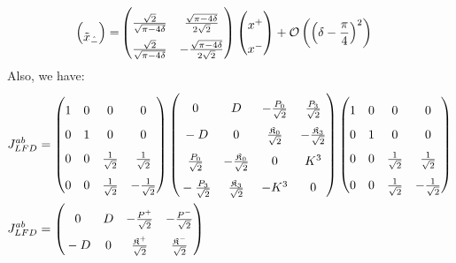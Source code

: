 \documentclass[]{article}
\numberwithin{equation}{section}
\begin{document}
{{\begin{align}
\begin{pmatrix}
    \rule{0pt}{16pt} \tilde{x}_{\hat{-}}
  \end{pmatrix}=&
  \begin{pmatrix}
    \rule{0pt}{16pt} \frac{\sqrt{2}}{\sqrt{\pi-4\delta}} & \frac{\sqrt{\pi-4\delta}}{2\sqrt{2}} \\
    \rule{0pt}{16pt} \frac{\sqrt{2}}{\sqrt{\pi-4\delta}} & -\frac{\sqrt{\pi-4\delta}}{2\sqrt{2}}
  \end{pmatrix}
  \begin{pmatrix}
    \rule{0pt}{16pt} x^{+}\\
   \rule{0pt}{16pt} x^{-}
  \end{pmatrix}+\mathcal{O}\left(\left(\delta-\frac{\pi}{4}\right)^{2}\right)
\end{align}
Also, we have:
\begin{align}
    J^{{a}{b}}_{LFD}&=\begin{pmatrix}
        \rule{0pt}{16pt} 1&0&0&0\\
        \rule{0pt}{16pt} 0&1&0&0\\
        \rule{0pt}{16pt} 0&0&\frac{1}{\sqrt{2}}&\frac{1}{\sqrt{2}}\\
        \rule{0pt}{16pt} 0&0&\frac{1}{\sqrt{2}}&-\frac{1}{\sqrt{2}}
    \end{pmatrix}\begin{pmatrix}
    \rule{0pt}{16pt} 0&D&-\frac{P_{{0}}}{\sqrt{2}}&\frac{P_{{3}}}{\sqrt{2}}\\
    \rule{0pt}{16pt} -D&0&\frac{\mathfrak{K}_{{0}}}{\sqrt{2}}&-\frac{\mathfrak{K}_{{3}}}{\sqrt{2}}\\
    \rule{0pt}{16pt} \frac{P_{{0}}}{\sqrt{2}}&-\frac{\mathfrak{K}_{{0}}}{\sqrt{2}}&0  & K^3\\
    \rule{0pt}{16pt} -\frac{P_{{3}}}{\sqrt{2}}&\frac{\mathfrak{K}_{{3}}}{\sqrt{2}}&-K^3  & 0
  \end{pmatrix}\begin{pmatrix}
        \rule{0pt}{16pt} 1&0&0&0\\
        \rule{0pt}{16pt} 0&1&0&0\\
        \rule{0pt}{16pt} 0&0&\frac{1}{\sqrt{2}}&\frac{1}{\sqrt{2}}\\
        \rule{0pt}{16pt} 0&0&\frac{1}{\sqrt{2}}&-\frac{1}{\sqrt{2}}
    \end{pmatrix}\\
    J^{{a}{b}}_{LFD}&=\begin{pmatrix}
    \rule{0pt}{16pt} 0&D&-\frac{P^{{+}}}{\sqrt{2}}&-\frac{P^{{-}}}{\sqrt{2}}\\
    \rule{0pt}{16pt} -D&0&\frac{\mathfrak{K}^{{+}}}{\sqrt{2}}&\frac{\mathfrak{K}^{{-}}}{\sqrt{2}}\\

\end{pmatrix}
\end{align}}}
\end{document}
